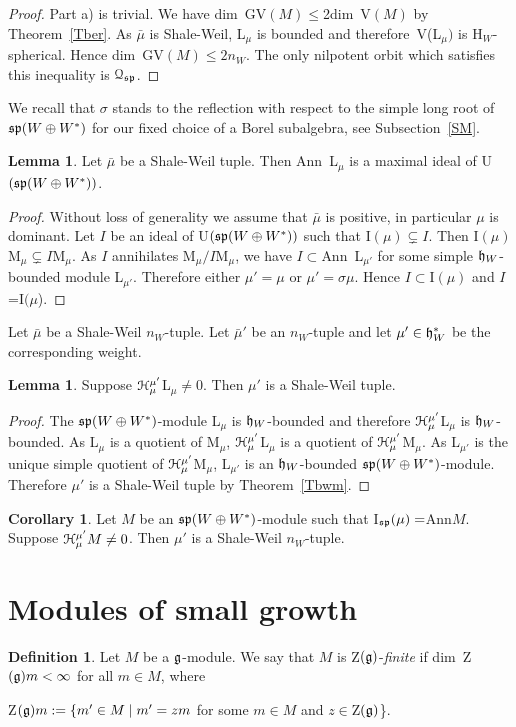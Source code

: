 \documentclass[12pt]{amsart}
\theoremstyle{definition}\newtheorem{theorem}{Theorem}[section]
\newtheorem{lemma}[proposition]{Lemma}
\newtheorem{corollary}[proposition]{Corollary}
\theoremstyle{definition}\newtheorem{definition}[proposition]{Definition}
\theoremstyle{remark}\newtheorem{example}[proposition]{Example}
\begin{document}
\begin{proof}Part a) is trivial. We have dim~GV$(M)\le$2dim~V$(M)$ by Theorem~\ref{Tber}. As $\bar\mu$ is Shale-Weil, L$_\mu$ is bounded and therefore~V(L$_\mu)$ is H$_W$-spherical. Hence dim~GV$(M)\le 2n_W$. The only nilpotent orbit which satisfies this inequality is $\EuScript Q_\frak{sp}$.\end{proof}
We recall that $\sigma$ stands to the reflection with respect to the simple long root of $\frak{sp}(W\oplus W^*)$ for our fixed choice of a Borel subalgebra, see Subsection~\ref{SM}.
\begin{lemma} Let $\bar\mu$ be a Shale-Weil tuple. Then Ann~L$_\mu$ is a maximal ideal of U$(\frak{sp}(W\oplus W^*))$.\end{lemma}
\begin{proof} Without loss of generality we assume that $\bar\mu$ is positive, in particular $\mu$ is dominant. Let $I$ be an ideal of U$(\frak{sp}(W\oplus W^*))$ such that I$(\mu)\subsetneq I$. Then I$(\mu)$M$_\mu\subsetneq I$M$_\mu$. As $I$ annihilates M$_\mu/I$M$_\mu$, we have $I\subset$Ann~L$_{\mu'}$ for some simple $\frak h_W$-bounded module L$_{\mu'}$. Therefore either $\mu'=\mu$ or $\mu'=\sigma\mu$. Hence $I\subset$I$(\mu)$ and $I$=I$(\mu$).\end{proof}
Let $\bar\mu$ be a Shale-Weil $n_W$-tuple. Let $\bar\mu'$ be an $n_W$-tuple and let $\mu'\in\frak h_W^*$ be the corresponding weight.
\begin{lemma} Suppose $\EuScript H_\mu^{\mu'}$L$_\mu\ne0$. Then $\mu'$ is a Shale-Weil tuple.\end{lemma}
\begin{proof} The $\frak{sp}(W\oplus W^*)$-module L$_\mu$ is $\frak h_W$-bounded and therefore $\EuScript H_\mu^{\mu'}$L$_\mu$ is $\frak h_W$-bounded. As L$_\mu$ is a quotient of M$_\mu$, $\EuScript H_\mu^{\mu'}$L$_\mu$ is a quotient of $\EuScript H_\mu^{\mu'}$M$_\mu$. As L$_{\mu'}$ is the unique simple quotient of $\EuScript H_\mu^{\mu'}$M$_\mu$, L$_{\mu'}$ is an $\frak h_W$-bounded $\frak{sp}(W\oplus W^*)$-module. Therefore $\mu'$ is a Shale-Weil tuple by Theorem~\ref{Tbwm}.\end{proof}
\begin{corollary}\label{Cgsp} Let $M$ be an $\frak{sp}(W\oplus W^*)$-module such that I$_\frak{sp}(\mu)=$Ann$M$. Suppose $\EuScript H_\mu^{\mu'}M\ne 0$. Then $\mu'$ is a Shale-Weil $n_W$-tuple.\end{corollary}
\newpage\section{Modules of small growth}\label{Ssmg}
\begin{definition}Let $M$ be a $\frak g$-module. We say that $M$ is Z$(\frak g)$-{\it finite} if dim~Z$(\frak g)m<\infty$ for all $m\in M$, where \begin{center}Z$(\frak g)m:=\{m'\in M\mid m'=zm$ for some $m\in M$ and $z\in$Z$(\frak g)$\}.\end{center}\end{definition}
\end{document}
